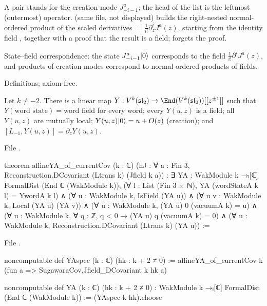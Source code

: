 \begin{dictionary}
A pair  stands for the creation mode $J^a_{-i-1}$; the head of the list is the leftmost
(outermost) operator.  (same file, not displayed) builds the right-nested normal-ordered
product of the scaled derivatives  $=\frac1{i!}\partial_z^iJ^a(z)$, starting from
the identity field , together with a proof that the result is a field; 
forgets the proof.
\end{dictionary}

\begin{physics}
State--field correspondence: the state $J^a_{-i-1}|0\rangle$ corresponds to the field
$\frac1{i!}\partial^iJ^a(z)$, and products of creation modes correspond to normal-ordered products
of fields.
\end{physics}

\begin{status}
Definitions; axiom-free.
\end{status}

\begin{theorem}\label{l08:thm:YA}
Let $k\ne-2$. There is a linear map $Y : V^k(\leightsl)\to\End(V^k(\leightsl))[[z^{\pm1}]]$ such that
$Y(\text{word state}) = \text{word field}$ for every word; every $Y(u,z)$ is a field; all $Y(u,z)$ are
mutually local; $Y(u,z)|0\rangle = u + O(z)$ (creation); and $[L_{-1},Y(u,z)] = \partial_zY(u,z)$.
\end{theorem}

\noindent File .
\begin{leancode}
theorem affineYA_of_currentCov (k : ℂ)
    (hJ : ∀ a : Fin 3, Reconstruction.DCovariant (Ltrans k) (Jfield k a)) :
    ∃ YA : WakModule k →ₗ[ℂ] FormalDist (End ℂ (WakModule k)),
      (∀ l : List (Fin 3 × ℕ), YA (wordStateA k l) = YwordA k l) ∧
      (∀ u : WakModule k, IsField (YA u)) ∧
      (∀ u v : WakModule k, Local (YA u) (YA v)) ∧
      (∀ u : WakModule k, (YA u) 0 (vacuumA k) = u) ∧
      (∀ u : WakModule k, ∀ q : ℤ, q < 0 → (YA u) q (vacuumA k) = 0) ∧
      (∀ u : WakModule k, Reconstruction.DCovariant (Ltrans k) (YA u)) :=
\end{leancode}
\noindent File .
\begin{leancode}
noncomputable def YAspec (k : ℂ) (hk : k + 2 ≠ 0) :=
  affineYA_of_currentCov k (fun a => SugawaraCov.Jfield_DCovariant k hk a)

noncomputable def YA (k : ℂ) (hk : k + 2 ≠ 0) :
    WakModule k →ₗ[ℂ] FormalDist (End ℂ (WakModule k)) :=
  (YAspec k hk).choose
\end{leancode}

